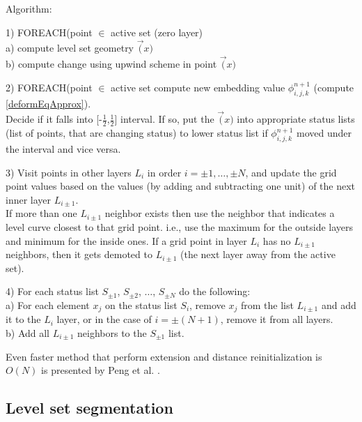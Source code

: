 \par
Algorithm:
\label{alg:sparseFileld}
\par
1) FOREACH(point $\in$ active set (zero layer)\\
  a) compute level set geometry $\vec(x)$\\
  b) compute change using upwind scheme in point $\vec(x)$
\par
2) FOREACH(point $\in$ active set compute new embedding value $\phi_{i,j,k}^{n+1}$ (compute \ref{deformEqApprox}).\\
Decide if it falls into [-$\frac{1}{2}$,$\frac{1}{2}$] interval.
If so, put the $\vec(x)$ into appropriate status lists (list of points, that are changing status) to lower status list if $\phi_{i,j,k}^{n+1}$ moved under the interval and vice versa.
\par
3) Visit points in other layers $L_i$ in order $i=\pm 1,\ldots, \pm N$, and update the grid point values based on the values (by adding and subtracting one unit) of the next inner layer $L_{i\pm1}$.\\
If more than one $L_{i\pm1}$ neighbor exists then use the neighbor that indicates a level curve closest to that grid point. i.e., use the maximum for the outside layers and minimum for the inside ones.
If a grid point in layer $L_i$ has no $L_{i\pm1}$ neighbors, then it gets demoted to $L_{i\pm1}$ (the next layer away from the active set).
\par
4) For each status list $S_{\pm1}$, $S_{\pm2}$, $\ldots$, $S_{\pm N}$ do the following:\\
  a) For each element $x_j$ on the status list $S_i$, remove $x_j$ from the list $L_{i\pm1}$ and add it to the $L_{i}$ layer, or in the case of $i=\pm (N + 1)$, remove it from all layers.\\
  b) Add all $L_{i\pm1}$ neighbors to the $S_{\pm1}$ list.

Even faster method that perform extension and distance reinitialization is $O(N)$ is presented by Peng et al. \cite{pengSparseFields}.

\subsection{Level set segmentation}

